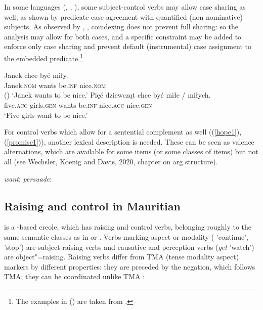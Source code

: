 \documentclass[output=paper
	        ,collection
	        ,collectionchapter
 	        ,biblatex
                ,babelshorthands
                ,newtxmath
                ,draftmode
                ,colorlinks, citecolor=brown
]{langscibook}
\begin{document}
In some  languages (, , ), some subject-control verbs may allow case sharing as well, as shown by predicate case agreement with quantified (non nominative) subjects. As observed by \cite{Przepiorkowski2004}, \cite{PrzepiorkowskiandRosen2005}, coindexing does not prevent full sharing: so the analysis may allow for both cases, and a specific constraint may be added to enforce only case sharing and prevent default (instrumental) case assignment to the embedded predicate.\footnote{%
The examples in () are taken from .
}

\begin{exe}
\ex \begin{xlist}
\ex 
\gll Janek chce byé miły.\\
     Janek.\textsc{nom} wants be.\textsc{inf} nice.\textsc{nom} \\ \hfill()
\glt `Janek wants to be nice.’
\ex 
\gll Pięć dziewcząt chce być miłe / miłych. \\
     five.\textsc{acc} girls.\textsc{gen} wants be.\textsc{inf} nice.\textsc{acc} {} nice.\textsc{gen}\\
\glt `Five girls want to be nice.’ 
	\end{xlist}
		
\end{exe}


For control verbs which allow for a sentential complement as well  ((\ref{hope1}), (\ref{promise1})), another lexical description is needed. These can be seen as valence alternations, which are available for some items (or some classes of items) but not all (see Wechsler, Koenig and Davis, 2020, chapter on arg structure).

\eal
\ex \emph{want}: 
\ex \emph{persuade}: 
\zl




\subsection{Raising and control in Mauritian} \label{sec-maurit}


 is a -based creole, which has raising and control verbs, belonging roughly to the same semantic classes as in  or . Verbs marking aspect or
modality ( 'continue',  'stop') are subject-raising verbs and causative and perception verbs (\emph{get} 'watch') are
object"=raising. Raising verbs differ from TMA (tense modality aspect) markers by different properties: they are preceded by
the negation, which follows TMA; they can be coordinated unlike TMA \citep[]{HenriandLaurens2011}:
\end{document}
